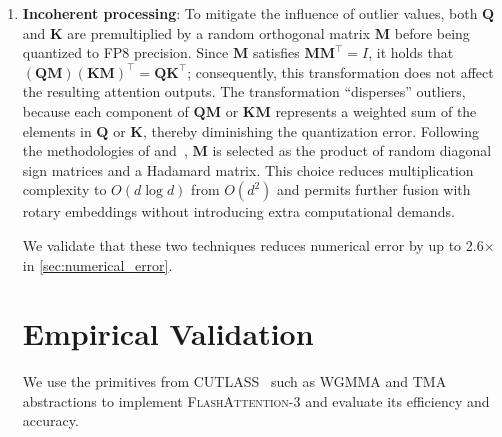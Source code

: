 \begin{algorithm}[H]
\begin{algorithmic}[1]
\begin{enumerate}
\item \textbf{Incoherent processing}: To mitigate the influence of outlier values, both $\mathbf{Q}$ and $\mathbf{K}$ are premultiplied by a random orthogonal matrix $\mathbf{M}$ before being quantized to FP8 precision. Since $\mathbf{M}$ satisfies $\mathbf{M} \mathbf{M}^\top = I$, it holds that $(\mathbf{Q} \mathbf{M}) (\mathbf{K} \mathbf{M})^\top = \mathbf{Q} \mathbf{K}^\top$; consequently, this transformation does not affect the resulting attention outputs. The transformation “disperses” outliers, because each component of $\mathbf{Q} \mathbf{M}$ or $\mathbf{K} \mathbf{M}$ represents a weighted sum of the elements in $\mathbf{Q}$ or $\mathbf{K}$, thereby diminishing the quantization error. Following the methodologies of \citet{chee2024quip} and~\citet{tseng2024quip}, $\mathbf{M}$ is selected as the product of random diagonal sign matrices and a Hadamard matrix. This choice reduces multiplication complexity to $O(d \log d)$ from $O(d^2)$ and permits further fusion with rotary embeddings without introducing extra computational demands.

We validate that these two techniques reduces numerical error by up to 2.6$\times$ in \cref{sec:numerical_error}.

\section{Empirical Validation}
\label{sec:exp}

We use the primitives from CUTLASS~\citep{Thakkar_CUTLASS_2023} such as WGMMA and TMA abstractions to implement \textsc{FlashAttention-3} and evaluate its efficiency and accuracy.

\begin{itemize}


\end{itemize}
\end{enumerate}
\end{algorithmic}
\end{algorithm}
